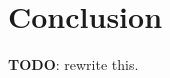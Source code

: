 \documentclass[eikonal.tex]{subfiles}
\begin{document}
\section{Conclusion} \textbf{TODO}: rewrite this.
\end{document}
